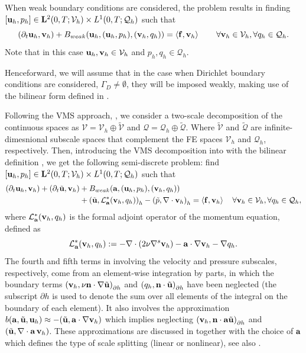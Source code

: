 When weak boundary conditions are considered, the problem results in finding $[{\bf u}_h,p_h]\in\mathbf{L}^2(0,T;\mathcal{V}_{h})\times L^1(0,T;\mathcal{Q}_{h})$ such that
\begin{equation}
\label{eq-C7_NS_galerkin_weak}
(\partial_t{\bf u}_h,{\bf v}_h)+B_{weak}({\bf u}_h,({\bf u}_h,p_h),({\bf v}_h,q_h)) =\left<{\bf f},{\bf v}_h\right>
\quad\quad\forall{\bf v}_h\in\mathcal{V}_{h},\forall q_h\in\mathcal{Q}_{h}.
\end{equation}
Note that in this case $ {\bf u}_h,{\bf v}_h\in\mathcal{V}_h $ and $ p_h,q_h\in\mathcal{Q}_h $.

Henceforward, we will assume that in the case when Dirichlet boundary conditions are considered, $ \Gamma_D\neq \emptyset $, they will be imposed weakly, making use of the bilinear form defined in .

Following the VMS approach, \cite{hughes_variational_1998}, we consider a two-scale decomposition of the continuous spaces as $ \mathcal{V}=\mathcal{V}_h\oplus\widetilde{\mathcal{V}} $ and $ \mathcal{Q}=\mathcal{Q}_h\oplus\widetilde{\mathcal{Q}} $. Where $ \widetilde{\mathcal{V}} $ and $\widetilde{\mathcal{Q}} $ are infinite-dimesnional subscale spaces that complement the FE spaces $ \mathcal{V}_h $ and $ \mathcal{Q}_h $, respectively. Then, introducing the VMS decomposition into  with the bilinear definition , we get the following semi-discrete problem: find 
$[{\bf u}_h,p_h]\in\mathbf{L}^2(0,T;\mathcal{V}_{h})\times L^1(0,T;\mathcal{Q}_{h})$ such that
\begin{align}
\label{eq-C7_NS_vms_weak}
(\partial_t{\bf u}_h,{\bf v}_h)+(\partial_t\tilde{{\bf u}},{\bf v}_h)&+B_{weak}({\bf a},({\bf u}_h,p_h),({\bf v}_h,q_h))\\\nonumber
&+\left(\tilde{{\bf u}},\mathcal{L}^*_{\bf a}({\bf v}_h,q_h)\right)_h-\left(\tilde{p},\nabla\cdot{\bf v}_h\right)_h =\left<{\bf f},{\bf v}_h\right>
\quad\forall{\bf v}_h\in\mathcal{V}_{h},\forall q_h\in\mathcal{Q}_{h},
\end{align}
where $ \mathcal{L}^*_{\bf a}({\bf v}_h,q_h) $ is the formal adjoint operator of the momentum equation, defined as 
\begin{equation}
\label{eq-C7_NS_adjoint}
\mathcal{L}^*_{\bf a}({\bf v}_h,q_h):=-\nabla\cdot\left(2\nu\nabla^s{\bf v}_h\right)-{\bf a}\cdot\nabla{\bf v}_h-\nabla q_h.
\end{equation}
The fourth and fifth terms in  involving the velocity and pressure subscales, respectively, come from an element-wise integration by parts, in which the boundary terms 
$\left( {\bf v}_{h},\nu {\bf n}\cdot \nabla \tilde{{\bf u}}\right)_{\partial h}$ and
$\left( q_{h},{\bf n}\cdot \tilde{{\bf u}}\right)_{\partial h}$
have been neglected (the subscript ${\partial h}$ is used to denote the sum over all elements of the integral on the boundary of each element). It also involves the approximation 
$b({\bf a},\tilde{{\bf u}},{\bf u}_h) \approx -(\tilde{{\bf u}},{\bf a}\cdot\nabla{\bf v}_h)$
which implies neglecting 
$\left( {\bf v}_{h},{\bf n}\cdot {\bf a} \tilde{{\bf u}}\right)_{\partial h}$ and
$(\tilde{{\bf u}},\nabla\cdot{\bf a} \, {\bf v}_h)$. 
These approximations are discussed in  \cite{codina_time_2007} together with the choice of ${\bf a}$ which defines the type of scale splitting (linear or nonlinear), see also \cite{colomes_assessment_2015}.

